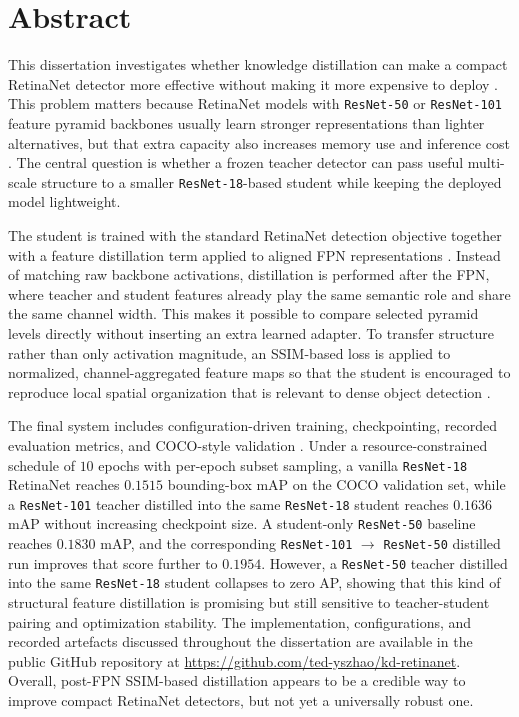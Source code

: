 \chapter*{Abstract}
This dissertation investigates whether knowledge distillation can make a compact RetinaNet detector more effective without making it more expensive to deploy \cite{hinton2015distilling,lin2017focal}. This problem matters because RetinaNet models with \texttt{ResNet-50} or \texttt{ResNet-101} feature pyramid backbones usually learn stronger representations than lighter alternatives, but that extra capacity also increases memory use and inference cost \cite{he2016resnet,lin2017fpn,lin2017focal}. The central question is whether a frozen teacher detector can pass useful multi-scale structure to a smaller \texttt{ResNet-18}-based student while keeping the deployed model lightweight.


The student is trained with the standard RetinaNet detection objective together with a feature distillation term applied to aligned FPN representations \cite{lin2017fpn,lin2017focal}. Instead of matching raw backbone activations, distillation is performed after the FPN, where teacher and student features already play the same semantic role and share the same channel width. This makes it possible to compare selected pyramid levels directly without inserting an extra learned adapter. To transfer structure rather than only activation magnitude, an SSIM-based loss is applied to normalized, channel-aggregated feature maps so that the student is encouraged to reproduce local spatial organization that is relevant to dense object detection \cite{wang2004ssim,derijk2022structural}.

The final system includes configuration-driven training, checkpointing, recorded evaluation metrics, and COCO-style validation \cite{lin2014coco}. Under a resource-constrained schedule of $10$ epochs with per-epoch subset sampling, a vanilla \texttt{ResNet-18} RetinaNet reaches $0.1515$ bounding-box mAP on the COCO validation set, while a \texttt{ResNet-101} teacher distilled into the same \texttt{ResNet-18} student reaches $0.1636$ mAP without increasing checkpoint size. A student-only \texttt{ResNet-50} baseline reaches $0.1830$ mAP, and the corresponding \texttt{ResNet-101} $\rightarrow$ \texttt{ResNet-50} distilled run improves that score further to $0.1954$. However, a \texttt{ResNet-50} teacher distilled into the same \texttt{ResNet-18} student collapses to zero AP, showing that this kind of structural feature distillation is promising but still sensitive to teacher-student pairing and optimization stability. The implementation, configurations, and recorded artefacts discussed throughout the dissertation are available in the public GitHub repository at \url{https://github.com/ted-yszhao/kd-retinanet}. Overall, post-FPN SSIM-based distillation appears to be a credible way to improve compact RetinaNet detectors, but not yet a universally robust one.
